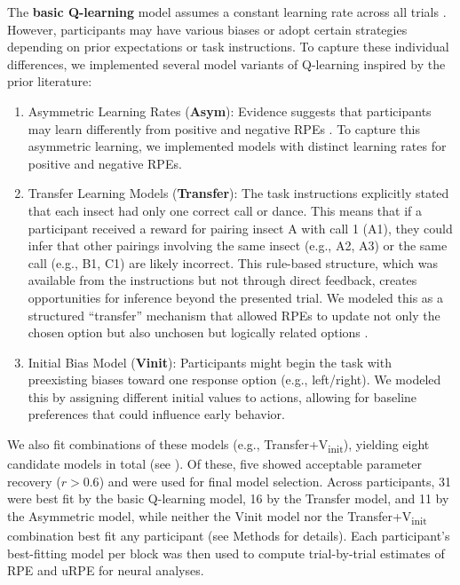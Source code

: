 \documentclass{article}
\begin{document}
The \textbf{basic Q-learning} model assumes a constant learning rate across all trials \cite{sutton2018reinforcement, rescorla1972theory}. However, participants may have various biases or adopt certain strategies depending on prior expectations or task instructions. To capture these individual differences, we implemented several model variants of Q-learning inspired by the prior literature:

\begin{enumerate}
    \item Asymmetric Learning Rates (\textbf{Asym}): Evidence suggests that participants may learn differently from positive and negative RPEs \cite{daw2002opponent, frank2007genetic, lefebvre2017behavioural, gershman2015learning}. To capture this asymmetric learning, we implemented models with distinct learning rates for positive and negative RPEs.
    \item Transfer Learning Models (\textbf{Transfer}): The task instructions explicitly stated that each insect had only one correct call or dance. This means that if a participant received a reward for pairing insect A with call 1 (A1), they could infer that other pairings involving the same insect (e.g., A2, A3) or the same call (e.g., B1, C1) are likely incorrect. This rule-based structure, which was available from the instructions but not through direct feedback, creates opportunities for inference beyond the presented trial. We modeled this as a structured “transfer” mechanism that allowed RPEs to update not only the chosen option but also unchosen but logically related options \cite{barakchian2022implicit}. 
    \item Initial Bias Model (\textbf{Vinit}): Participants might begin the task with preexisting biases toward one response option (e.g., left/right). We modeled this by assigning different initial values to actions, allowing for baseline preferences that could influence early behavior.
\end{enumerate}

We also fit combinations of these models (e.g., Transfer+V\textsubscript{init}), yielding eight candidate models in total (see ). Of these, five showed acceptable parameter recovery ($r > 0.6$) and were used for final model selection. Across participants, 31 were best fit by the basic Q-learning model, 16 by the Transfer model, and 11 by the Asymmetric model, while neither the Vinit model nor the Transfer+V\textsubscript{init} combination best fit any participant (see Methods for details). Each participant’s best-fitting model per block was then used to compute trial-by-trial estimates of RPE and uRPE for neural analyses.\newline
\end{document}
